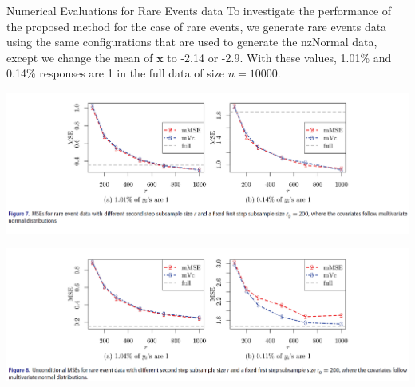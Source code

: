 \documentclass[12pt]{beamer}
\begin{document}
\begin{frame}{Numerical Evaluations for Rare Events data}
To investigate the performance of the proposed method for the
case of rare events, we generate rare events data using the same
configurations that are used to generate the nzNormal data, except we change the mean of $\mathbf{x}$ to -2.14 or -2.9. With
these values, 1.01\% and 0.14\% responses are 1 in the full data of size $n=10000$.
\end{frame}


\begin{frame}
\includegraphics[scale=0.65]{fig13.png} 
\end{frame}

\begin{frame}
\includegraphics[scale=0.65]{fig14.png} 
\end{frame}
\end{document}
